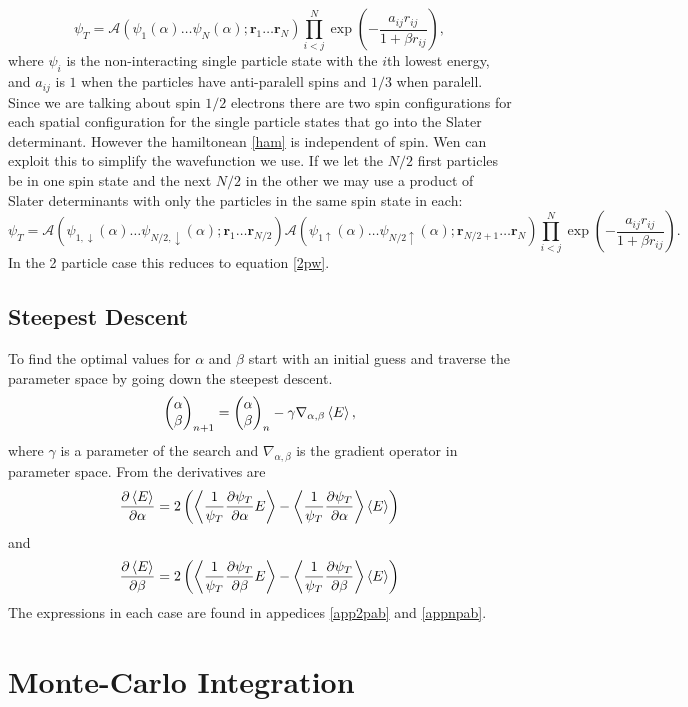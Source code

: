 \documentclass[a4paper,English,10pt]{article}
\newcommand{\bb}[1]{\boldsymbol{#1}}
\newcommand{\p}{\partial}
\newcommand{\pddt}[2]{\frac{\p #1}{\p #2}}
\newcommand{\uar}{\uparrow}
\newcommand{\dar}{\downarrow}
\newcommand{\be}{\begin{equation}}
\newcommand{\ee}{\end{equation}}
\newcommand{\f}{\frac}
\renewcommand{\braket}{\Braket}
\begin{document}
\be
\psi_T =  \mathcal{A}\left(\psi_1(\alpha)\ldots\psi_N(\alpha);\bb{r}_1\ldots\bb{r}_N\right)\prod_{i<j}^N\exp\left(-\f{a_{ij}r_{ij}}{1+\beta r_{ij}}\right),
\ee
where  $\psi_i$ is the non-interacting single particle state with the $i$th lowest energy,
and $a_{ij}$ is $1$ when the particles have anti-paralell spins and $1/3$ when paralell.
Since we are talking about spin $1/2$ electrons there are two spin configurations for each spatial configuration for the single particle states that go into the Slater determinant.
However the hamiltonean \ref{ham} is independent of spin. Wen can exploit this to simplify the wavefunction we use. If we let
the $N/2$ first particles be in one spin state and the next $N/2$ in the other we may use a product of Slater determinants with only the particles in the same spin state in each:
\be
\psi_T = \mathcal{A}\left(\psi_{1,\dar}(\alpha)\ldots\psi_{N/2,\dar}(\alpha);\bb{r}_1\ldots\bb{r}_{N/2}\right)\mathcal{A}\left(\psi_{1\uar}(\alpha)\ldots\psi_{N/2\uar}(\alpha);\bb{r}_{N/2+1}\ldots\bb{r}_N\right)\prod_{i<j}^N\exp\left(-\f{a_{ij}r_{ij}}{1+\beta r_{ij}}\right).\label{npw}
\ee
In the 2 particle case this reduces to equation \ref{2pw}.


\subsection{Steepest Descent}
To find the optimal values for $\alpha$ and $\beta$ start with an initial guess and traverse the parameter space by going down the steepest descent.
\be
\left(\begin{matrix}\alpha\\\beta\end{matrix}\right)_{n+1} =  \left(\begin{matrix}\alpha\\\beta\end{matrix}\right)_{n} - \gamma\nabla_{\alpha,\beta}\braket{E},
\ee
where $\gamma$ is a parameter of the search and $\nabla_{\alpha,\beta}$ is the gradient operator in parameter space.
From \cite{mortenbok} the derivatives are
\be
\pddt{\braket{E}}{\alpha} = 2\left(\braket{\f{1}{\psi_T}\pddt{\psi_T}{\alpha}E} - \braket{\f{1}{\psi_T}\pddt{\psi_T}{\alpha}}\braket{E}\right)
\ee
and 
\be
\pddt{\braket{E}}{\beta} = 2\left(\braket{\f{1}{\psi_T}\pddt{\psi_T}{\beta}E} - \braket{\f{1}{\psi_T}\pddt{\psi_T}{\beta} }\braket{E}\right)
\ee
The expressions in each case are found in appedices \ref{app2pab} and \ref{appnpab}.

\section{Monte-Carlo Integration}
\end{document}
